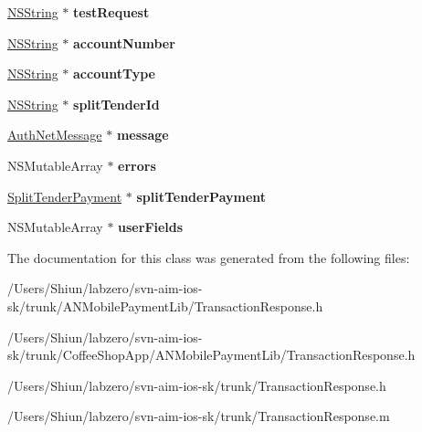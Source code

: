 \begin{DoxyCompactItemize}
\item 
\hypertarget{interface_transaction_response_a0c86c18d4a3e37a35af3440b0dee12ec}{
\hyperlink{class_n_s_string}{NSString} $\ast$ {\bfseries testRequest}}
\label{interface_transaction_response_a0c86c18d4a3e37a35af3440b0dee12ec}

\item 
\hypertarget{interface_transaction_response_ad60833873e6fe7a4df18d08865c6a756}{
\hyperlink{class_n_s_string}{NSString} $\ast$ {\bfseries accountNumber}}
\label{interface_transaction_response_ad60833873e6fe7a4df18d08865c6a756}

\item 
\hypertarget{interface_transaction_response_a7f232f224dba8314f23aa45ac95c8317}{
\hyperlink{class_n_s_string}{NSString} $\ast$ {\bfseries accountType}}
\label{interface_transaction_response_a7f232f224dba8314f23aa45ac95c8317}

\item 
\hypertarget{interface_transaction_response_ac5c1c2ab8f9fe27d58ce78749439eac7}{
\hyperlink{class_n_s_string}{NSString} $\ast$ {\bfseries splitTenderId}}
\label{interface_transaction_response_ac5c1c2ab8f9fe27d58ce78749439eac7}

\item 
\hypertarget{interface_transaction_response_a22d07155d08195c7af4ca059065be396}{
\hyperlink{interface_auth_net_message}{AuthNetMessage} $\ast$ {\bfseries message}}
\label{interface_transaction_response_a22d07155d08195c7af4ca059065be396}

\item 
\hypertarget{interface_transaction_response_a729a3177b03de5e82fd8bd64160de649}{
NSMutableArray $\ast$ {\bfseries errors}}
\label{interface_transaction_response_a729a3177b03de5e82fd8bd64160de649}

\item 
\hypertarget{interface_transaction_response_aad5bf4e9639e0b185aa96b48ebf4d088}{
\hyperlink{interface_split_tender_payment}{SplitTenderPayment} $\ast$ {\bfseries splitTenderPayment}}
\label{interface_transaction_response_aad5bf4e9639e0b185aa96b48ebf4d088}

\item 
\hypertarget{interface_transaction_response_a1a6206b30c5b77a8c9c07d1c9313806e}{
NSMutableArray $\ast$ {\bfseries userFields}}
\label{interface_transaction_response_a1a6206b30c5b77a8c9c07d1c9313806e}

\end{DoxyCompactItemize}


The documentation for this class was generated from the following files:\begin{DoxyCompactItemize}
\item 
/Users/Shiun/labzero/svn-\/aim-\/ios-\/sk/trunk/ANMobilePaymentLib/TransactionResponse.h\item 
/Users/Shiun/labzero/svn-\/aim-\/ios-\/sk/trunk/CoffeeShopApp/ANMobilePaymentLib/TransactionResponse.h\item 
/Users/Shiun/labzero/svn-\/aim-\/ios-\/sk/trunk/TransactionResponse.h\item 
/Users/Shiun/labzero/svn-\/aim-\/ios-\/sk/trunk/TransactionResponse.m\end{DoxyCompactItemize}
